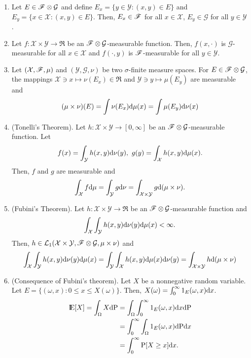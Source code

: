 \documentclass[a4paper,10pt]{scrbook}
\begin{document}
\begin{enumerate}
 \item Let $E\in \mathscr{F}\otimes\mathcal{G}$ and define 
       $E_x = \{y\in \mathcal{Y}: (x,y)\in E\}$ and $E_y = \{x\in \mathcal{X}: (x,y)\in E\}$.
       Then, $E_x\in \mathscr{F}$ for all $x\in\mathcal{X}$, $E_y\in\mathcal{G}$ for all $y\in\mathcal{Y}$.
 \item Let $f:\mathcal{X}\times\mathcal{Y}\to \Re$ be an $\mathscr{F}\otimes \mathcal{G}$-measurable function.
       Then, $f(x,\cdot)$ is $\mathcal{G}$-measurable for all $x\in\mathcal{X}$ and 
       $f(\cdot, y)$ is $\mathscr{F}$-measurable for all $y\in\mathcal{Y}$.
 \item Let $(\mathcal{X},\mathscr{F},\mu)$ and $(\mathcal{Y},\mathcal{G},\nu)$ be two $\sigma$-finite measure spaces.
       For $E\in\mathscr{F}\otimes\mathcal{G}$, the mappings $\mathcal{X}\ni x\mapsto \nu(E_x) \in \Re$ and 
       $\mathcal{Y}\ni y\mapsto \mu(E_y)$ are measurable and
       \[
        (\mu\times \nu)(E) = \int \nu(E_x)\mathrm{d} \mu(x) = \int \mu(E_y)\mathrm{d} \nu(x)
       \]
 \item (Tonelli's Theorem). Let $h:\mathcal{X}\times \mathcal{Y}\to[0,\infty]$ be an $\mathscr{F}\otimes\mathcal{G}$-measurable
       function. Let
       \[
        f(x) = \int_{\mathcal{Y}} h(x,y) \mathrm{d}\nu(y), \ g(y) = \int_{\mathcal{X}}h(x,y)\mathrm{d}\mu(x).
       \]
       Then, $f$ and $g$ are measurable and 
       \[
        \int_{\mathcal{X}}f\mathrm{d}\mu = \int_{\mathcal{Y}}g\mathrm{d}\nu = \int_{\mathcal{X}\times\mathcal{Y}}g\mathrm{d}(\mu\times \nu).
       \]
 \item (Fubini's Theorem). 
       Let $h:\mathcal{X}\times \mathcal{Y}\to \Re$ be an $\mathscr{F}\otimes\mathcal{G}$-measurable
       function and
       \[
        \int_{\mathcal{X}} \int_{\mathcal{Y}} h(x,y)\mathrm{d}\nu(y) \mathrm{d}\mu(x) < \infty.
       \]
       Then, $h\in\mathcal{L}_1(\mathcal{X}\times\mathcal{Y}, \mathscr{F}\otimes\mathcal{G}, \mu\times\nu)$ and
        \[
        \int_{\mathcal{X}} \int_{\mathcal{Y}} h(x,y)\mathrm{d}\nu(y) \mathrm{d}\mu(x) = 
        \int_{\mathcal{Y}} \int_{\mathcal{X}} h(x,y)\mathrm{d}\mu(x) \mathrm{d}\nu(y) = 
        \int_{\mathcal{X}\times\mathcal{Y}} h \mathrm{d}(\mu\times \nu)
       \]
       
 \item (Consequence of Fubini's theorem). Let $X$ be a nonnegative random variable. Let $E=\{(\omega, x): 0 \leq x\leq X(\omega)\}$.
       Then, $X(\omega) = \int_{0}^{\infty}1_{E}(\omega, x)\mathrm{d} x$.
       \begin{align*}
        \E[X] = \int_{\Omega}X\d\prob &= \int_{\Omega}\int_{0}^{\infty}1_{E}(\omega, x)\d x\d \prob\\
                                      &= \int_{0}^{\infty} \int_{\Omega} 1_{E}(\omega, x)\d \prob \d x\\
                                      &= \int_{0}^{\infty} \prob[X\geq x]\d x.
       \end{align*}

\end{enumerate}
\end{document}
